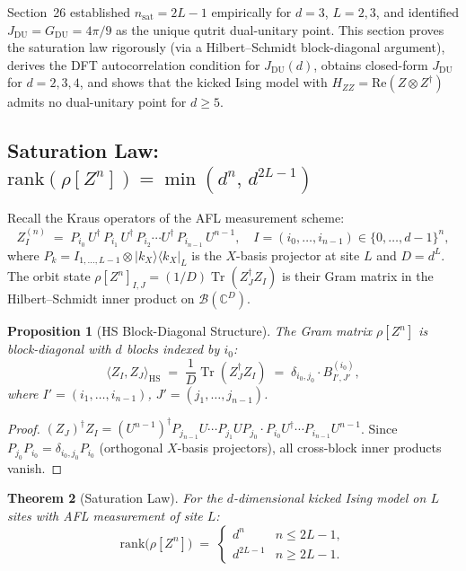 \documentclass[12pt,a4paper]{article}
\newtheorem{theorem}{Theorem}[section]
\newtheorem{proposition}[theorem]{Proposition}
\begin{document}
Section~26 established $n_{\mathrm{sat}}=2L-1$ empirically for $d=3$, $L=2,3$, and
identified $J_{\mathrm{DU}}=G_{\mathrm{DU}}=4\pi/9$ as the unique qutrit dual-unitary point.
This section proves the saturation law rigorously (via a Hilbert--Schmidt block-diagonal argument),
derives the DFT autocorrelation condition for $J_{\mathrm{DU}}(d)$,
obtains closed-form $J_{\mathrm{DU}}$ for $d=2,3,4$, and shows that the kicked Ising model
with $H_{ZZ}=\mathrm{Re}(Z\otimes Z^\dagger)$ admits no dual-unitary point for $d\geq 5$.

\subsection{Saturation Law: $\mathrm{rank}(\rho[Z^n])=\min(d^n,\,d^{2L-1})$}
\label{subsec:saturation_proof}

Recall the Kraus operators of the AFL measurement scheme:
\[
  Z^{(n)}_{I} \;=\; P_{i_0}\,U^\dagger\,P_{i_1}\,U^\dagger\,P_{i_2}\cdots U^\dagger\,P_{i_{n-1}}\,U^{n-1},
  \quad I=(i_0,\ldots,i_{n-1})\in\{0,\ldots,d-1\}^n,
\]
where $P_k=I_{1,\ldots,L-1}\otimes|k_X\rangle\langle k_X|_L$ is the $X$-basis projector at site $L$
and $D=d^L$.
The orbit state $\rho[Z^n]_{I,J}=(1/D)\operatorname{Tr}(Z^\dagger_J Z_I)$ is their Gram matrix
in the Hilbert--Schmidt inner product on $\mathcal{B}(\mathbb{C}^D)$.

\begin{proposition}[HS Block-Diagonal Structure]
\label{prop:hs_block}
The Gram matrix $\rho[Z^n]$ is block-diagonal with $d$ blocks indexed by $i_0$:
\[
  \langle Z_I, Z_J\rangle_{\mathrm{HS}} \;=\;
  \frac{1}{D}\operatorname{Tr}(Z^\dagger_J Z_I)
  \;=\; \delta_{i_0,j_0}\cdot B^{(i_0)}_{I',J'},
\]
where $I'=(i_1,\ldots,i_{n-1})$, $J'=(j_1,\ldots,j_{n-1})$.
\end{proposition}

\begin{proof}
$(Z_J)^\dagger Z_I
= (U^{n-1})^\dagger P_{j_{n-1}}U\cdots P_{j_1} U P_{j_0} \cdot P_{i_0} U^\dagger\cdots P_{i_{n-1}} U^{n-1}$.
Since $P_{j_0}P_{i_0}=\delta_{i_0,j_0}P_{i_0}$ (orthogonal $X$-basis projectors),
all cross-block inner products vanish.
\end{proof}

\begin{theorem}[Saturation Law]
\label{thm:saturation}
For the $d$-dimensional kicked Ising model on $L$ sites with AFL measurement of site $L$:
\[
  \mathrm{rank}\bigl(\rho[Z^n]\bigr)
  \;=\;
  \begin{cases}
    d^n & n \leq 2L-1,\\
    d^{2L-1} & n \geq 2L-1.
  \end{cases}
\]
\end{theorem}
\end{document}
